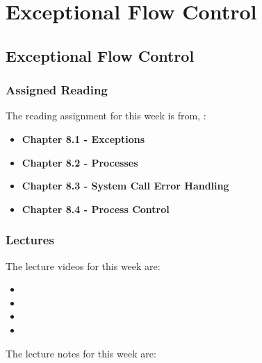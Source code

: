 \clearpage

\renewcommand{\ChapTitle}{Exceptional Flow Control}
\renewcommand{\SectionTitle}{Exceptional Flow Control}

\chapter{\ChapTitle}
\section{\SectionTitle}

\subsection{Assigned Reading}

The reading assignment for this week is from, \Textbook:

\begin{itemize}
    \item \textbf{Chapter 8.1 - Exceptions}
    \item \textbf{Chapter 8.2 - Processes}
    \item \textbf{Chapter 8.3 - System Call Error Handling}
    \item \textbf{Chapter 8.4 - Process Control}
\end{itemize}

\subsection{Lectures}

The lecture videos for this week are:

\begin{itemize}
    \item {}
    \item {}
    \item {}
    \item {}
\end{itemize}

\noindent The lecture notes for this week are:

